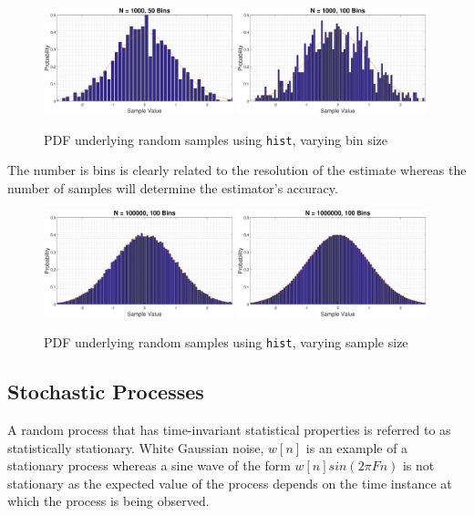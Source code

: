 \documentclass{article}
\begin{document}
\begin{figure}[H]
\includegraphics[width=0.49\textwidth]{N_1000_B_50_randn}
\includegraphics[width=0.49\textwidth]{N_1000_B_100_randn}
\caption{PDF underlying random samples using {\tt hist}, varying bin size}
\end{figure}

The number is bins is clearly related to the resolution of the estimate whereas the number of samples will determine the estimator's accuracy.

\begin{figure}[H]
\includegraphics[width=0.49\textwidth]{N_100000_B_100_randn}
\includegraphics[width=0.49\textwidth]{N_1000000_B_100_randn}
\caption{PDF underlying random samples using {\tt hist}, varying sample size}
\end{figure}


\newpage
\subsection{Stochastic Processes}
A random process that has time-invariant statistical properties is referred to as statistically stationary. White Gaussian noise, $w[n]$ is an example of a stationary process whereas a sine wave of the form $w[n]sin(2\pi Fn)$ is not stationary as the expected value of the process depends on the time instance at which the process is being observed. 
\end{document}
